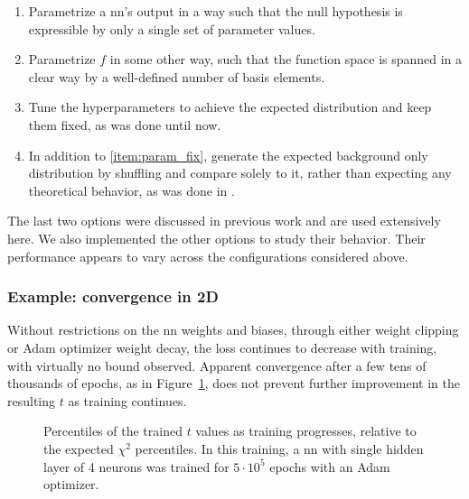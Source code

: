 \documentclass[paper/ddppaper2.tex]{subfiles}
\begin{document}
\begin{enumerate}
    \item Parametrize a \gls{nn}'s output in a way such that the null hypothesis is expressible by only a single set of parameter values.
    \item Parametrize $f$ in some other way, such that the function space is spanned in a clear way by a well-defined number of basis elements.
    \item Tune the hyperparameters to achieve the expected distribution and keep them fixed, as was done until now. \label{item:param_fix}
    \item In addition to \ref{item:param_fix}, generate the expected background only distribution by shuffling and compare solely to it, rather than expecting any theoretical behavior, as was done in \cite{LastDDPPaper}.
\end{enumerate}

The last two options were discussed in previous work and are used extensively here. We also implemented the other options to study their behavior. Their performance appears to vary across the configurations considered above.

\subsubsection{Example: convergence in 2D}

Without restrictions on the \gls{nn} weights and biases, through either weight clipping or Adam optimizer weight decay, the loss continues to decrease with training, with virtually no bound observed. Apparent convergence after a few tens of thousands of epochs, as in Figure~\ref{fig:2d-nonconverging-percentiles}, does not prevent further improvement in the resulting $t$ as training continues.

\begin{figure}
    \caption{Percentiles of the trained $t$ values as training progresses, relative to the expected $\chi^2$ percentiles. In this training, a \gls{nn} with single hidden layer of 4 neurons was trained for $5\cdot 10^5$ epochs with an Adam optimizer.}
    \label{fig:2d-nonconverging-percentiles}
\end{figure}
\end{document}
